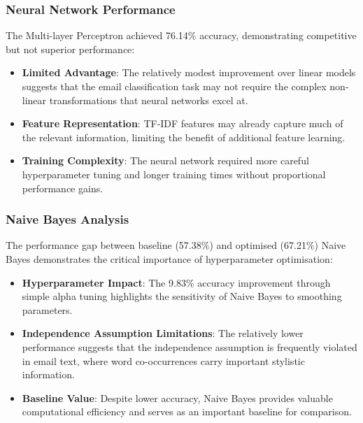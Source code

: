 \documentclass[11pt,a4paper]{article}
\begin{document}
\subsubsection{Neural Network Performance}

The Multi-layer Perceptron achieved 76.14\% accuracy, demonstrating competitive but not superior performance:

\begin{itemize}
    \item \textbf{Limited Advantage}: The relatively modest improvement over linear models suggests that the email classification task may not require the complex non-linear transformations that neural networks excel at.
    
    \item \textbf{Feature Representation}: TF-IDF features may already capture much of the relevant information, limiting the benefit of additional feature learning.
    
    \item \textbf{Training Complexity}: The neural network required more careful hyperparameter tuning and longer training times without proportional performance gains.
\end{itemize}

\subsubsection{Naive Bayes Analysis}

The performance gap between baseline (57.38\%) and optimised (67.21\%) Naive Bayes demonstrates the critical importance of hyperparameter optimisation:

\begin{itemize}
    \item \textbf{Hyperparameter Impact}: The 9.83\% accuracy improvement through simple alpha tuning highlights the sensitivity of Naive Bayes to smoothing parameters.
    
    \item \textbf{Independence Assumption Limitations}: The relatively lower performance suggests that the independence assumption is frequently violated in email text, where word co-occurrences carry important stylistic information.
    
    \item \textbf{Baseline Value}: Despite lower accuracy, Naive Bayes provides valuable computational efficiency and serves as an important baseline for comparison.
\end{itemize}
\end{document}
